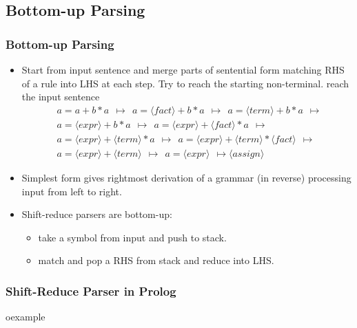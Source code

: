 \subsection{Bottom-up Parsing}
\begin{frame}
\frametitle{Bottom-up Parsing}
\begin{itemize}
\item Start from input sentence and merge parts of sentential form matching RHS of a rule into LHS at each step. Try to reach the starting non-terminal.
	reach the input sentence \\ {\small
	\[ \begin{array}{l}
	~~ a = a + b * a  ~~ \mapsto
	~~ a = \langle fact \rangle + b * a  ~~ \mapsto 
	~~ a = \langle term\rangle + b * a  ~~ \mapsto \\
	~~ a = \langle expr\rangle + b * a  ~~ \mapsto
	~~ a = \langle expr\rangle + \langle fact\rangle * a  ~~ \mapsto \\
	~~ a = \langle expr\rangle + \langle term\rangle * a  ~~ \mapsto
	~~ a = \langle expr\rangle + \langle term\rangle * \langle fact\rangle  ~~ \mapsto \\
	~~ a = \langle expr\rangle + \langle term\rangle ~~ \mapsto
	~~ a = \langle expr\rangle ~~ \mapsto
	\langle assign \rangle 
\end{array}
	\]}
\item Simplest form gives rightmost derivation of a grammar (in reverse) processing input
	from left to right.
\item Shift-reduce parsers are bottom-up:
	\begin{itemize}
	\item {} take a symbol from input and push to stack.
	\item {} match and pop a RHS from stack and reduce into	
	LHS.
	\end{itemize}
\end{itemize}
\end{frame}


\begin{frame}
\frametitle{Shift-Reduce Parser in Prolog}
\begin{beamercolorbox}{oexample}
\codeshiftreduce
\end{beamercolorbox}
\end{frame}

